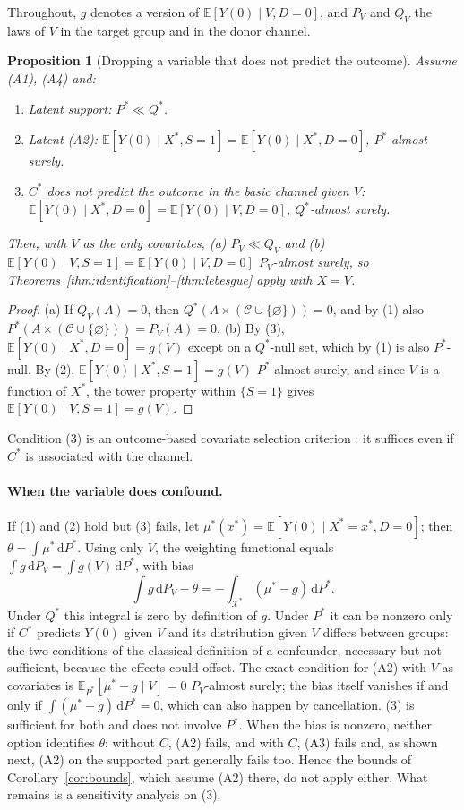 \documentclass[11pt,a4paper]{article}
\newcommand{\E}{\mathbb{E}}
\newcommand{\X}{\mathcal{X}}
\newcommand{\dd}{\,\mathrm{d}}
\newcommand{\vacio}{\varnothing}
\theoremstyle{plain}
\newtheorem{proposition}{Proposition}
\theoremstyle{definition}
\begin{document}
Throughout, $g$ denotes a version of $\E[Y(0)\mid V,D=0]$, and $P_V$ and $Q_V$ the laws of $V$ in the target group and in the donor channel.

\begin{proposition}[Dropping a variable that does not predict the outcome]\label{prop:drop}
Assume (A1), (A4) and:
\begin{enumerate}
  \item \emph{Latent support:} $P^*\ll Q^*$.
  \item \emph{Latent (A2):} $\E[Y(0)\mid X^*,S=1]=\E[Y(0)\mid X^*,D=0]$, $P^*$-almost surely.
  \item \emph{$C^*$ does not predict the outcome in the basic channel given $V$:} $\E[Y(0)\mid X^*,D=0]=\E[Y(0)\mid V,D=0]$, $Q^*$-almost surely.
\end{enumerate}
Then, with $V$ as the only covariates, (a) $P_V\ll Q_V$ and (b) $\E[Y(0)\mid V,S=1]=\E[Y(0)\mid V,D=0]$ $P_V$-almost surely, so Theorems~\ref{thm:identification}--\ref{thm:lebesgue} apply with $X=V$.
\end{proposition}
\begin{proof}
(a) If $Q_V(A)=0$, then $Q^*(A\times(\mathcal C\cup\{\vacio\}))=0$, and by (1) also $P^*(A\times(\mathcal C\cup\{\vacio\}))=P_V(A)=0$.
(b) By (3), $\E[Y(0)\mid X^*,D=0]=g(V)$ except on a $Q^*$-null set, which by (1) is also $P^*$-null. By (2), $\E[Y(0)\mid X^*,S=1]=g(V)$ $P^*$-almost surely, and since $V$ is a function of $X^*$, the tower property within $\{S=1\}$ gives $\E[Y(0)\mid V,S=1]=g(V)$.
\end{proof}

Condition (3) is an outcome-based covariate selection criterion \citep{deluna2011}: it suffices even if $C^*$ is associated with the channel.

\paragraph{When the variable does confound.} If (1) and (2) hold but (3) fails, let $\mu^*(x^*)=\E[Y(0)\mid X^*=x^*,D=0]$; then $\theta=\int\mu^*\dd P^*$. Using only $V$, the weighting functional equals $\int g\dd P_V=\int g(V)\dd P^*$, with bias
\[
\int g\dd P_V-\theta=-\int_{\X^*}(\mu^*-g)\dd P^*.
\]
Under $Q^*$ this integral is zero by definition of $g$. Under $P^*$ it can be nonzero only if $C^*$ predicts $Y(0)$ given $V$ and its distribution given $V$ differs between groups: the two conditions of the classical definition of a confounder, necessary but not sufficient, because the effects could offset. The exact condition for (A2) with $V$ as covariates is $\E_{P^*}[\mu^*-g\mid V]=0$ $P_V$-almost surely; the bias itself vanishes if and only if $\int(\mu^*-g)\dd P^*=0$, which can also happen by cancellation. (3) is sufficient for both and does not involve $P^*$. When the bias is nonzero, neither option identifies $\theta$: without $C$, (A2) fails, and with $C$, (A3) fails and, as shown next, (A2) on the supported part generally fails too. Hence the bounds of Corollary~\ref{cor:bounds}, which assume (A2) there, do not apply either. What remains is a sensitivity analysis on (3).
\end{document}
